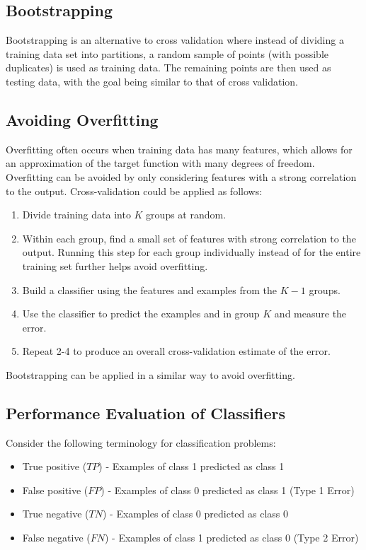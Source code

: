 \documentclass[12pt,titlepage]{article}
\begin{document}
    \subsection{Bootstrapping}
      Bootstrapping is an alternative to cross validation where instead of dividing a training data set into partitions, a random sample of points
      (with possible duplicates) is used as training data. The remaining points are then used as testing data, with the goal being similar to
      that of cross validation.

    \subsection{Avoiding Overfitting}
      Overfitting often occurs when training data has many features, which allows for an approximation of the target function with many degrees of
      freedom. Overfitting can be avoided by only considering features with a strong correlation to the output. Cross-validation could be applied
      as follows:
      \begin{enumerate}
        \item Divide training data into $K$ groups at random.
        \item Within each group, find a small set of features with strong correlation to the output. Running this step for each group individually
          instead of for the entire training set further helps avoid overfitting.
        \item Build a classifier using the features and examples from the $K - 1$ groups.
        \item Use the classifier to predict the examples and in group $K$ and measure the error.
        \item Repeat 2-4 to produce an overall cross-validation estimate of the error.
      \end{enumerate}

      Bootstrapping can be applied in a similar way to avoid overfitting.

    \subsection{Performance Evaluation of Classifiers}
      Consider the following terminology for classification problems:
      \begin{itemize}
        \item True positive ($TP$) - Examples of class 1 predicted as class 1
        \item False positive ($FP$) - Examples of class 0 predicted as class 1 (Type 1 Error)
        \item True negative ($TN$) - Examples of class 0 predicted as class 0
        \item False negative ($FN$) - Examples of class 1 predicted as class 0 (Type 2 Error)
      \end{itemize}
\end{document}
